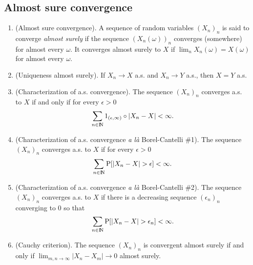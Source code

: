 \documentclass[a4paper,10pt]{scrbook}
\begin{document}
\subsection{Almost sure convergence}
\begin{enumerate}
 \item (Almost sure convergence). A sequence of random variables $(X_n)_n$ is said to converge \textit{almost surely}
       if the sequence $(X_n(\omega))_n$ converges (somewhere) for almost every $\omega$. It converges almost surely to $X$
       if $\lim_n X_n(\omega) = X(\omega)$ for almost every $\omega$.
              
       
 \item (Uniqueness almost surely). If $X_n \to X$ a.s. and $X_n \to Y$ a.s., then $X=Y$ a.s.
 
 \item (Characterization of a.s. convergence). The sequence $(X_n)_n$ converges a.s. to $X$ if and only if for every $\epsilon>0$
       \[
        \sum_{n\in\N}1_{(\epsilon,\infty)}\circ|X_n - X| < \infty.
       \]

 \item (Characterization of a.s. convergence \textit{a l\`a} Borel-Cantelli \#1).
       The sequence $(X_n)_n$ converges a.s. to $X$ if for every $\epsilon>0$
       \[
        \sum_{n\in\N}\prob[|X_n-X|>\epsilon] < \infty.
       \]

 \item (Characterization of a.s. convergence \textit{a l\`a} Borel-Cantelli \#2).
       The sequence $(X_n)_n$ converges a.s. to $X$ if there is a decreasing sequence $(\epsilon_n)_n$
       converging to $0$ so that 
       \[
        \sum_{n\in\N}\prob[|X_n-X|>\epsilon_n] < \infty.
       \]     
       
 \item (Cauchy criterion). The sequence $(X_n)_n$ is convergent almost surely if and only if
       $\lim_{m,n\to \infty}|X_n-X_m|\to 0$ almost surely.
       

\end{enumerate}
\end{document}
